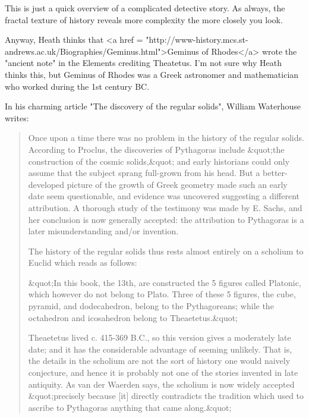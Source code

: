 This is just a quick overview of a complicated detective story. 
As always, the fractal texture of history reveals more complexity 
the more closely you look.

Anyway, Heath thinks that <a href =
"http://www-history.mcs.st-andrews.ac.uk/Biographies/Geminus.html">Geminus
of Rhodes</a> wrote the "ancient note" in the Elements
crediting Theatetus.  I'm not sure why Heath thinks this, but Geminus
of Rhodes was a Greek astronomer and mathematician who worked during
the 1st century BC.

In his charming article "The discovery of the regular
solids", William Waterhouse writes:

\begin{quote}
   Once upon a time there was no problem in the history of the regular
   solids.  According to Proclus, the discoveries of Pythagoras 
   include &quot;the construction of the cosmic solids,&quot; and early 
   historians could only assume that the subject sprang full-grown 
   from his head.  But a better-developed picture of the growth
   of Greek geometry made such an early date seem questionable, and 
   evidence was uncovered suggesting a different attribution.  A 
   thorough study of the testimony was made by E. Sachs, and her 
   conclusion is now generally accepted: the attribution to Pythagoras 
   is a later misunderstanding and/or invention.

   The history of the regular solids thus rests almost entirely on a 
   scholium to Euclid which reads as follows: 

   &quot;In this book, the 13th, are constructed the 5 figures called 
   Platonic, which however do not belong to Plato.  Three of these 
   5 figures, the cube, pyramid, and dodecahedron, belong to the 
   Pythagoreans; while the octahedron and icosahedron belong to 
   Theaetetus.&quot;

   Theaetetus lived c. 415-369 B.C., so this version gives a 
   moderately late date; and it has the considerable advantage of 
   seeming unlikely.  That is, the details in the scholium are not 
   the sort of history one would naively conjecture, and hence it 
   is probably not one of the stories invented in late antiquity.  
   As van der Waerden says, the scholium is now widely accepted 
   &quot;precisely because [it] directly contradicts the tradition which 
   used to ascribe to Pythagoras anything that came along.&quot;  


\end{quote}
